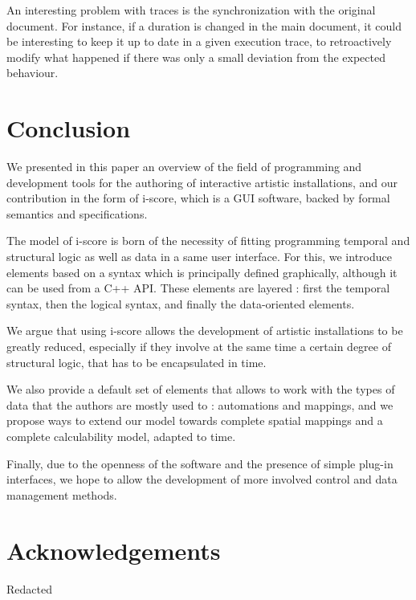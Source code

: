 \documentclass{sigchi}
\begin{document}
An interesting problem with traces is the synchronization with the original document. For instance, if a duration is changed in the main document, it could be interesting to keep it up to date in a given execution trace, to retroactively modify what happened if there was only a small deviation from the expected behaviour.

\section{Conclusion}
We presented in this paper an overview of the field of programming and development tools for the authoring of interactive artistic installations, and our contribution in the form of i-score, which is a GUI software, backed by formal semantics and specifications. 

The model of i-score is born of the necessity of fitting programming temporal and structural logic as well as data in a same user interface. For this, we introduce elements based on a syntax which is principally defined graphically, although it can be used from a C++ API. These elements are layered : first the temporal syntax, then the logical syntax, and finally the data-oriented elements.  

We argue that using i-score allows the development of artistic installations to be greatly reduced, especially if they involve at the same time a certain degree of structural logic, that has to be encapsulated in time.

We also provide a default set of elements that allows to work with the types of data that the authors are mostly used to : automations and mappings, and we propose ways to extend our model towards complete spatial mappings and a complete calculability model, adapted to time.

Finally, due to the openness of the software and the presence of simple plug-in interfaces, we hope to allow the development of more involved control and data management methods.
\section{Acknowledgements}
Redacted



\end{document}
